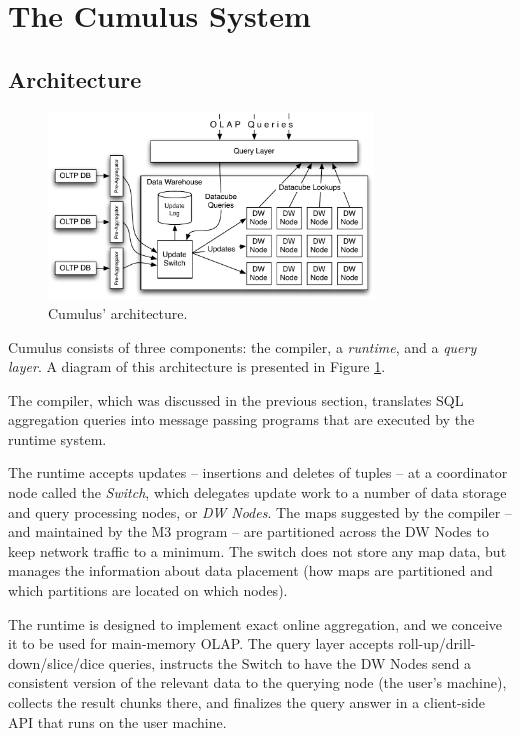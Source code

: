 

\section{The Cumulus System}
\label{sec:architecture}


\subsection{Architecture}


\begin{figure}
\hspace{-3mm}
\includegraphics[width=3.4in]{images/Architecture.pdf}

\vspace{-4mm}

\caption{Cumulus' architecture.}
\label{fig:arch}
\end{figure}


Cumulus consists of three components: the compiler,
a {\em runtime}, and a {\em query layer}.
A diagram of this architecture is presented in Figure \ref{fig:arch}.

The compiler, which was discussed in the
previous section, translates SQL aggregation queries
into message passing programs that are executed by the runtime system.

The runtime accepts updates -- insertions and deletes of tuples --
at a coordinator node called the \textit{Switch}, which delegates
update work to a number of data storage and query processing nodes, or
\textit{DW Nodes}.
The maps suggested by the compiler -- and maintained by the M3 program --
are partitioned across the DW Nodes to keep network traffic to a minimum.  
The switch does not store any map data, but manages
the information about data placement (how maps are partitioned and which
partitions are located on which nodes).

The runtime is designed to implement exact online aggregation, and
we conceive it to be used for main-memory OLAP.
The query layer accepts roll-up/drill-down/slice/dice queries,
instructs the Switch to have the DW Nodes send a consistent version of
the relevant data to the querying node (the user's machine),
collects the result chunks there, and
finalizes the query answer
in a client-side API that runs on the user machine.

